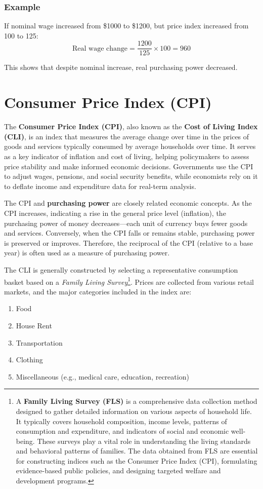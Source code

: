 \documentclass[twoside]{book}
\begin{document}
\subsubsection{Example}

If nominal wage increased from \$1000 to \$1200, but price index increased from 100 to 125:
$$\text{Real wage change} = \dfrac{1200}{125} \times 100 = 960$$

This shows that despite nominal increase, real purchasing power decreased.

\section{Consumer Price Index (CPI)}

The \textbf{Consumer Price Index (CPI)}, also known as the \textbf{Cost of Living Index (CLI)}, is an index that measures the average change over time in the prices of goods and services typically consumed by average households over time. It serves as a key indicator of inflation and cost of living, helping policymakers to assess price stability and make informed economic decisions. Governments use the CPI to adjust wages, pensions, and social security benefits, while economists rely on it to deflate income and expenditure data for real-term analysis.

The CPI and \textbf{purchasing power} are closely related economic concepts. As the CPI increases, indicating a rise in the general price level (inflation), the purchasing power of money decreases—each unit of currency buys fewer goods and services. Conversely, when the CPI falls or remains stable, purchasing power is preserved or improves. Therefore, the reciprocal of the CPI (relative to a base year) is often used as a measure of purchasing power.

The CLI is generally constructed by selecting a representative consumption basket based on a \textit{Family Living Survey}\footnote{A \textbf{Family Living Survey (FLS)} is a comprehensive data collection method designed to gather detailed information on various aspects of household life. It typically covers household composition, income levels, patterns of consumption and expenditure, and indicators of social and economic well-being. These surveys play a vital role in understanding the living standards and behavioral patterns of families. The data obtained from FLS are essential for constructing indices such as the Consumer Price Index (CPI), formulating evidence-based public policies, and designing targeted welfare and development programs.}. Prices are collected from various retail markets, and the major categories included in the index are:
\begin{enumerate}
    \item Food
    \item House Rent
    \item Transportation
    \item Clothing
    \item Miscellaneous (e.g., medical care, education, recreation)
\end{enumerate}
\end{document}
